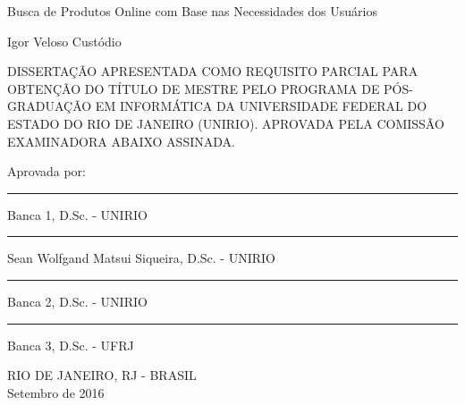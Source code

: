 \begin{center}
    Busca de Produtos Online com Base nas Necessidades dos Usuários
    
    \vskip 1.5cm

    Igor Veloso Custódio
    \vskip 1.0cm

\end{center}

\begin{center}
DISSERTAÇÃO APRESENTADA COMO REQUISITO PARCIAL PARA OBTENÇÃO DO TÍTULO DE MESTRE PELO PROGRAMA DE PÓS-GRADUAÇÃO EM INFORMÁTICA DA UNIVERSIDADE FEDERAL DO ESTADO DO RIO DE JANEIRO (UNIRIO). APROVADA PELA COMISSÃO EXAMINADORA ABAIXO ASSINADA.
\vskip 1.0cm
\end{center}

\begin{flushleft}
    Aprovada por:
    \vskip 1.0cm

\end{flushleft}

\begin{flushright}
    \rule{10.0cm}{.1mm}

    Banca 1, D.Sc. - UNIRIO
    \vskip 0.5cm

    \rule{10.0cm}{.1mm}

    Sean Wolfgand Matsui Siqueira, D.Sc. - UNIRIO
    \vskip 0.5cm

    \rule{10.0cm}{.1mm}

    Banca 2, D.Sc. - UNIRIO
    \vskip 0.5cm

    \rule{10.0cm}{.1mm}

    Banca 3, D.Sc. - UFRJ
    \vskip 0.5cm
    
\end{flushright}
\begin{center}
    RIO DE JANEIRO, RJ - BRASIL \\ Setembro de 2016
\end{center}

